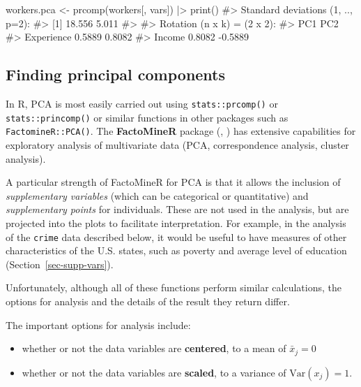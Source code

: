 \documentclass[
  letterpaper,
  10pt,
  krantz2]{krantz}
\makeatletter
\newenvironment{Shaded}{\begin{snugshade}}{\end{snugshade}}
\newcommand{\CommentTok}[1]{\textcolor[rgb]{0.37,0.37,0.37}{#1}}
\newcommand{\FunctionTok}[1]{\textcolor[rgb]{0.28,0.35,0.67}{#1}}
\newcommand{\NormalTok}[1]{\textcolor[rgb]{0.00,0.23,0.31}{#1}}
\newcommand{\OtherTok}[1]{\textcolor[rgb]{0.00,0.23,0.31}{#1}}
\newcommand{\SpecialCharTok}[1]{\textcolor[rgb]{0.37,0.37,0.37}{#1}}
\providecommand{\tightlist}{%
  \setlength{\itemsep}{0pt}\setlength{\parskip}{0pt}}\usepackage{longtable,booktabs,array}
\newenvironment{kframe}{%
  \medskip{}
  \setlength{\fboxsep}{.8em}
  \def\at@end@of@kframe{}%
  \ifinner\ifhmode%
  \def\at@end@of@kframe{\end{minipage}}%
  \begin{minipage}{\columnwidth}%
  \fi\fi%
  \def\FrameCommand##1{\hskip\@totalleftmargin \hskip-\fboxsep
  \colorbox{shadecolor}{##1}\hskip-\fboxsep
      \hskip-\linewidth \hskip-\@totalleftmargin \hskip\columnwidth}%
  \MakeFramed {\advance\hsize-\width
    \@totalleftmargin\z@ \linewidth\hsize
    \@setminipage}}%
{\par\unskip\endMakeFramed%
  \at@end@of@kframe}
\renewenvironment{Shaded}{\begin{kframe}}{\end{kframe}}
\makeatother
\begin{document}
\begin{Shaded}
\begin{Highlighting}[]
\NormalTok{workers.pca }\OtherTok{\textless{}{-}} \FunctionTok{prcomp}\NormalTok{(workers[, vars]) }\SpecialCharTok{|\textgreater{}} \FunctionTok{print}\NormalTok{()}
\CommentTok{\#\textgreater{} Standard deviations (1, .., p=2):}
\CommentTok{\#\textgreater{} [1] 18.556  5.011}
\CommentTok{\#\textgreater{} }
\CommentTok{\#\textgreater{} Rotation (n x k) = (2 x 2):}
\CommentTok{\#\textgreater{}               PC1     PC2}
\CommentTok{\#\textgreater{} Experience 0.5889  0.8082}
\CommentTok{\#\textgreater{} Income     0.8082 {-}0.5889}
\end{Highlighting}
\end{Shaded}

\subsection{Finding principal
components}\label{finding-principal-components}

In R, PCA is most easily carried out using \texttt{stats::prcomp()} or
\texttt{stats::princomp()} or similar functions in other packages such
as \texttt{FactomineR::PCA()}. The \textbf{FactoMineR} package
(,
) has extensive capabilities for
exploratory analysis of multivariate data (PCA, correspondence analysis,
cluster analysis).

A particular strength of FactoMineR for PCA is that it allows the
inclusion of \emph{supplementary variables} (which can be categorical or
quantitative) and \emph{supplementary points} for individuals. These are
not used in the analysis, but are projected into the plots to facilitate
interpretation. For example, in the analysis of the \texttt{crime} data
described below, it would be useful to have measures of other
characteristics of the U.S. states, such as poverty and average level of
education (Section~\ref{sec-supp-vars}).

Unfortunately, although all of these functions perform similar
calculations, the options for analysis and the details of the result
they return differ.

The important options for analysis include:

\begin{itemize}
\tightlist
\item
  whether or not the data variables are \textbf{centered}, to a mean of
  \(\bar{x}_j =0\)
\item
  whether or not the data variables are \textbf{scaled}, to a variance
  of \(\text{Var}(x_j) =1\).
\end{itemize}
\end{document}
